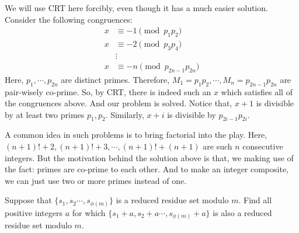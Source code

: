 \documentclass{subfile}
\begin{document}
		\begin{solution}
			We will use CRT here forcibly, even though it has a much easier solution. Consider the following congruences:
				\begin{align*}
					x & \equiv -1\pmod{p_1p_2}\\
					x & \equiv -2\pmod{p_3p_4}\\
					  & \vdots \\
					x & \equiv -n\pmod{p_{2n-1}p_{2n}}
				\end{align*}
			Here, $p_1,\cdots,p_{2n}$ are distinct primes. Therefore, $M_1=p_1p_2,\cdots,M_n=p_{2n-1}p_{2n}$ are pair-wisely co-prime. So, by CRT, there is indeed such an $x$ which satisfies all of the congruences above. And our problem is solved. Notice that, $x+1$ is divisible by at least two primes $p_1,p_2$. Similarly, $x+i$ is divisible by $p_{2i-1}p_{2i}$.
		\end{solution}

		\begin{note}
			A common idea in such problems is to bring factorial into the play. Here, $(n+1)!+2,(n+1)!+3,\cdots,(n+1)!+(n+1)$ are such $n$ consecutive integers. But the motivation behind the solution above is that, we making use of the fact: primes are co-prime to each other. And to make an integer composite, we can just use two or more primes instead of one.
		\end{note}

		\begin{problem}
			Suppose that $ \{s_1,s_2\cdots , s_{\phi(m)}\} $ is a reduced residue set modulo $m$. Find all positive integers $a$ for which $ \{s_1+a,s_2+a\cdots , s_{\phi(m)}+a\} $ is also a reduced residue set modulo $m$.
		\end{problem}
\end{document}
